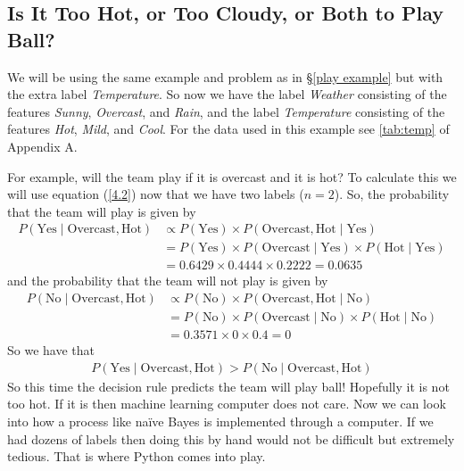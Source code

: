 \documentclass[12pt,twoside]{report}   %
\newcommand{\ti}{\textit}
\newcommand{\te}{\text}
\begin{document}
\subsection{Is It Too Hot, or Too Cloudy, or Both to Play Ball?}\label{temp example}
\vspace{-0.35in}
\underline{\hspace{6.2in}}
\vspace{-0.1in}

We will be using the same example and problem as in \S\ref{play example} but with the extra label \ti{Temperature}. So now we have the label \ti{Weather} consisting of the features \ti{Sunny}, \ti{Overcast}, and \ti{Rain}, and the label \ti{Temperature} consisting of the features \ti{Hot}, \ti{Mild}, and \ti{Cool}. For the data used in this example see \ref{tab:temp} of Appendix A.

For example, will the team play if it is overcast and it is hot? To calculate this we will use equation (\ref{4.2}) now that we have two labels ($n = 2$). So, the probability that the team will play is given by
\begin{align*}
P(\text{Yes}\mid \te{Overcast}, \te{Hot}) &\propto P(\te{Yes})\times P(\te{Overcast},\te{Hot}\mid\te{Yes})\\
&= P(\te{Yes})\times P(\te{Overcast}\mid\te{Yes})\times P(\te{Hot}\mid\te{Yes})\\
&= 0.6429 \times 0.4444 \times 0.2222 = 0.0635
\end{align*}
and the probability that the team will not play is given by
\begin{align*}
P(\text{No}\mid \te{Overcast}, \te{Hot}) &\propto P(\te{No})\times P(\te{Overcast},\te{Hot}\mid\te{No})\\
&= P(\te{No})\times P(\te{Overcast}\mid\te{No})\times P(\te{Hot}\mid\te{No})\\
&= 0.3571 \times 0 \times 0.4 = 0
\end{align*}
So we have that
\begin{align*}
P(\text{Yes}\mid\te{Overcast}, \te{Hot}) > P(\text{No}\mid\te{Overcast}, \te{Hot})
\end{align*}
So this time the decision rule predicts the team will play ball! Hopefully it is not too hot. If it is then machine learning computer does not care. Now we can look into how a process like na\"{i}ve Bayes is implemented through a computer. If we had dozens of labels then doing this by hand would not be difficult but extremely tedious. That is where Python comes into play.
\end{document}
